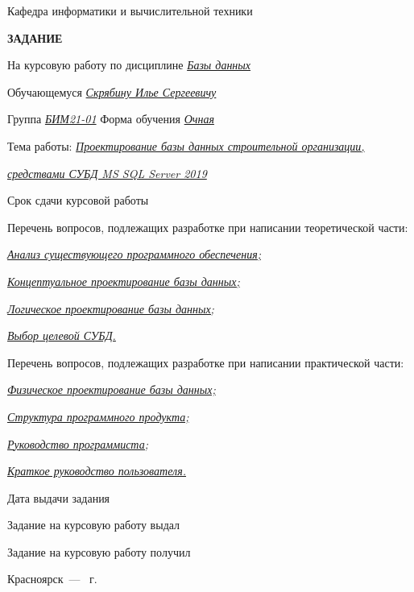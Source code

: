 \documentclass{../SIBGU-state}
\begin{document}
\begin{titlepage}
\begin{center}
        Кафедра информатики и вычислительной техники \par
        \bigskip\bigskip\bigskip
        \fontsize{16pt}{16pt}\selectfont
		\textbf{ЗАДАНИЕ} \par
    \end{center}
	На курсовую работу по дисциплине \uline{\textit{Базы данных}} \smallskip\par
    Обучающемуся \uline{\textit{Скрябину Илье Сергеевичу}} \smallskip\par
    Группа \uline{\textit{БИМ21-01}}{\hspace{3cm}} Форма обучения \uline{\textit{Очная}} \smallskip\par
    Тема работы: \uline{\textit{Проектирование базы данных строительной организации,}}\par
    \uline{\textit{средствами СУБД MS SQL Server 2019}} \smallskip\par
    Срок сдачи курсовой работы \hfill\textit{} \bigskip\par
    Перечень вопросов, подлежащих разработке при написании теоретической части: \par
    \uline{\textit{Анализ существующего программного обеспечения;}} \par
    \uline{\textit{Концептуальное проектирование базы данных;}} \par
    \uline{\textit{Логическое проектирование базы данных;}} \par
    \uline{\textit{Выбор целевой СУБД.}} \bigskip\par
    Перечень вопросов, подлежащих разработке при написании практической части: \par
    \uline{\textit{Физическое проектирование базы данных;}} \par
    \uline{\textit{Структура программного продукта;}} \par
    \uline{\textit{Руководство программиста;}} \par
    \uline{\textit{Краткое руководство пользователя.}} \bigskip\par
    \bigskip\bigskip\bigskip
    Дата выдачи задания \hfill\textit{} \bigskip\par
	Задание на курсовую работу выдал  \hfill{} \par
	Задание на курсовую работу получил  \hfill{} \par\bigskip
	\begin{center}
		Красноярск~--- \the\year{}~г.
	\end{center}
\end{titlepage}
\addtocounter{page}{2}
\end{document}

